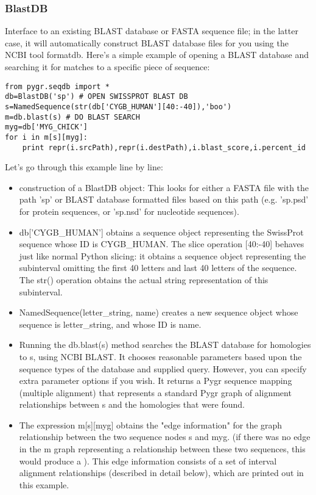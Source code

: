 \documentclass{howto}
\begin{document}
\subsubsection{BlastDB}
Interface to an existing BLAST database or FASTA sequence file; in the latter case, it will automatically construct BLAST database files for you using the NCBI tool formatdb. Here's a simple example of opening a BLAST database and searching it for matches to a specific piece of sequence:

\begin{verbatim}
from pygr.seqdb import *
db=BlastDB('sp') # OPEN SWISSPROT BLAST DB
s=NamedSequence(str(db['CYGB_HUMAN'][40:-40]),'boo')
m=db.blast(s) # DO BLAST SEARCH
myg=db['MYG_CHICK']
for i in m[s][myg]:
    print repr(i.srcPath),repr(i.destPath),i.blast_score,i.percent_id
\end{verbatim}

Let's go through this example line by line:

\begin{itemize}

\item    
construction of a BlastDB object: This looks for either a FASTA file with the path 'sp' or BLAST database formatted files based on this path (e.g. 'sp.psd' for protein sequences, or 'sp.nsd' for nucleotide sequences).

\item
db['CYGB_HUMAN'] obtains a sequence object representing the SwissProt sequence whose ID is CYGB_HUMAN.  The slice operation [40:-40] behaves just like normal Python slicing: it obtains a sequence object representing the subinterval omitting the first 40 letters and last 40 letters of the sequence.  The str() operation obtains the actual string representation of this subinterval.

\item
NamedSequence(letter_string, name) creates a new sequence object whose sequence is letter_string, and whose ID is name.

\item
Running the db.blast(s) method searches the BLAST database for homologies to s, using NCBI BLAST.  It chooses reasonable parameters based upon the sequence types of the database and supplied query.  However, you can specify extra parameter options if you wish.  It returns a Pygr sequence mapping (multiple alignment) that represents a standard Pygr graph of alignment relationships between s and the homologies that were found.

\item
The expression m[s][myg] obtains the "edge information" for the graph relationship between the two sequence nodes s and myg.  (if there was no edge in the m graph representing a relationship between these two sequences, this would produce a 
).  This edge information consists of a set of interval alignment relationships (described in detail below), which are printed out in this example.

\end{itemize}
\end{document}
